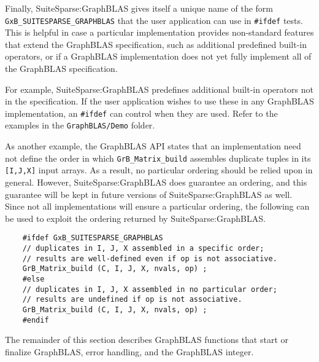 \documentclass[12pt]{article}
\begin{document}
Finally, SuiteSparse:GraphBLAS gives itself a unique name of the form
\verb'GxB_SUITESPARSE_GRAPHBLAS' that the user application can use in
\verb'#ifdef' tests. This is helpful in case a particular implementation
provides non-standard features that extend the GraphBLAS specification, such as
additional predefined built-in operators, or if a GraphBLAS implementation does
not yet fully implement all of the GraphBLAS specification.

For example, SuiteSparse:GraphBLAS predefines additional built-in operators not
in the specification.  If the user application wishes to use these in any
GraphBLAS implementation, an \verb'#ifdef' can control when they are used.
Refer to the examples in the \verb'GraphBLAS/Demo' folder.

As another example, the GraphBLAS API states that an
implementation need not define the order in which \verb'GrB_Matrix_build'
assembles duplicate tuples in its \verb'[I,J,X]' input arrays.  As a result, no
particular ordering should be relied upon in general.  However,
SuiteSparse:GraphBLAS does guarantee an ordering, and this guarantee will be
kept in future versions of SuiteSparse:GraphBLAS as well.  Since not all
implementations will ensure a particular ordering, the following can be used to
exploit the ordering returned by SuiteSparse:GraphBLAS.

    {\footnotesize
    \begin{verbatim}
    #ifdef GxB_SUITESPARSE_GRAPHBLAS
    // duplicates in I, J, X assembled in a specific order;
    // results are well-defined even if op is not associative.
    GrB_Matrix_build (C, I, J, X, nvals, op) ;
    #else
    // duplicates in I, J, X assembled in no particular order;
    // results are undefined if op is not associative.
    GrB_Matrix_build (C, I, J, X, nvals, op) ;
    #endif \end{verbatim}}

The remainder of this section describes GraphBLAS functions that start or finalize GraphBLAS,
error handling, and the GraphBLAS integer.
\end{document}
